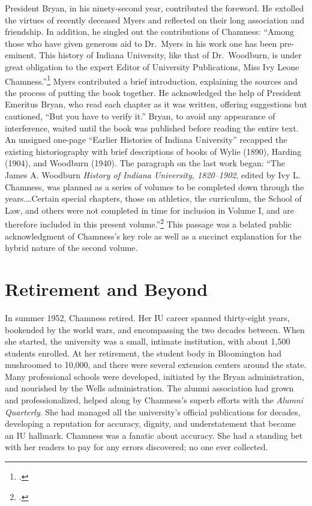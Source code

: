 \documentclass[
  american,
  letterpaper,
]{scrreprt}
\begin{document}
President Bryan, in his ninety-second year, contributed the foreword. He
extolled the virtues of recently deceased Myers and reflected on their
long association and friendship. In addition, he singled out the
contributions of Chamness: ``Among those who have given generous aid to
Dr.~Myers in his work one has been pre-eminent. This history of Indiana
University, like that of Dr.~Woodburn, is under great obligation to the
expert Editor of University Publications, Miss Ivy Leone
Chamness.''\footnote{.} Myers
contributed a brief introduction, explaining the sources and the process
of putting the book together. He acknowledged the help of President
Emeritus Bryan, who read each chapter as it was written, offering
suggestions but cautioned, ``But you have to verify it.'' Bryan, to
avoid any appearance of interference, waited until the book was
published before reading the entire text. An unsigned one-page ``Earlier
Histories of Indiana University'' recapped the existing historiography
with brief descriptions of books of Wylie (1890), Harding (1904), and
Woodburn (1940). The paragraph on the last work began: ``The James A.
Woodburn \emph{History of Indiana University, 1820--1902}, edited by Ivy
L. Chamness, was planned as a series of volumes to be completed down
through the years.\ldots Certain special chapters, those on athletics,
the curriculum, the School of Law, and others were not completed in time
for inclusion in Volume I, and are therefore included in this present
volume.''\footnote{.} This passage
was a belated public acknowledgment of Chamness's key role as well as a
succinct explanation for the hybrid nature of the second volume.

\section{Retirement and Beyond}\label{retirement-and-beyond}

In summer 1952, Chamness retired. Her IU career spanned thirty-eight
years, bookended by the world wars, and encompassing the two decades
between. When she started, the university was a small, intimate
institution, with about 1,500 students enrolled. At her retirement, the
student body in Bloomington had mushroomed to 10,000, and there were
several extension centers around the state. Many professional schools
were developed, initiated by the Bryan administration, and nourished by
the Wells administration. The alumni association had grown and
professionalized, helped along by Chamness's superb efforts with the
\emph{Alumni Quarterly}. She had managed all the university's official
publications for decades, developing a reputation for accuracy, dignity,
and understatement that became an IU hallmark. Chamness was a fanatic
about accuracy. She had a standing bet with her readers to pay for any
errors discovered; no one ever collected.
\end{document}

